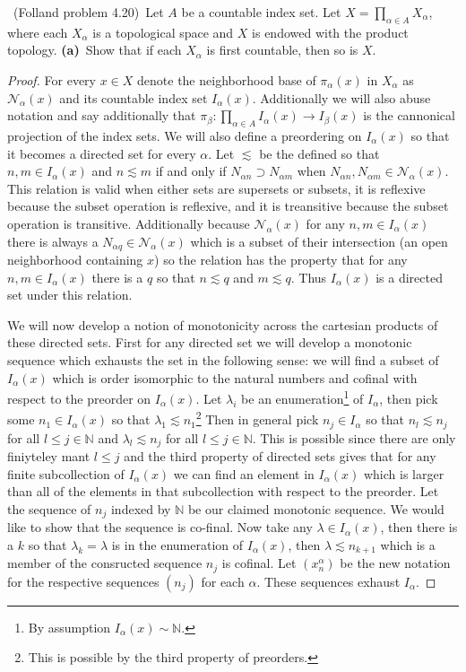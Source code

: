 \documentclass[11pt]{amsart}
\theoremstyle{definition}
\numberwithin{theorem}{section}
\numberwithin{definition}{section}
\numberwithin{equation}{section}
\def\scriptn{{\mathcal N}}
\begin{document}
\medskip {}\ (Folland problem 4.20)\ 
Let $A$ be a countable index set.
Let $X = \prod_{\alpha\in A} X_\alpha$,
where each $X_\alpha$ is a topological space
and $X$ is endowed with the product topology.
{\bf (a)}\ 
Show that if each $X_\alpha$ is first countable, then so is $X$.
\begin{proof}
	For every $x \in X$ denote the neighborhood base of $\pi_\alpha(x)$ in $X_\alpha$ as $\scriptn_\alpha(x)$ and its countable index set $I_\alpha(x)$. Additionally we will also abuse notation and say additionally that $\pi_\beta : \prod_{\alpha \in A} I_\alpha(x) \to I_\beta(x)$ is the cannonical projection of the index sets. We will also define a preordering on $I_\alpha(x)$ so that it becomes a directed set for every $\alpha.$ Let $\lesssim$ be the defined so that $n, m \in I_\alpha(x)$ and $n \lesssim m$ if and only if $N_{\alpha n} \supset N_{\alpha m}$ when $N_{\alpha n}, N_{\alpha m} \in \scriptn_\alpha(x)$. This relation  is valid when either sets are supersets or subsets, it is reflexive because the subset operation is reflexive, and it is treansitive because the subset operation is transitive. Additionally because $\scriptn_\alpha(x)$ for any $n,m \in I_\alpha(x)$ there is always a $N_{\alpha q} \in \scriptn_\alpha(x)$ which is a subset of their intersection (an open neighborhood containing $x$) so the relation has the property that for any $n,m \in I_\alpha(x)$ there is a $q$ so that $n \lesssim q$ and $m\lesssim q$. Thus $I_\alpha(x)$ is a directed set under this relation.

	We will now develop a notion of monotonicity across the cartesian products of these directed sets. First for any directed set we will develop a monotonic sequence which exhausts the set in the following sense: we will find a subset of $I_\alpha(x)$ which is order isomorphic to the natural numbers and cofinal with respect to the preorder on $I_\alpha(x).$ Let $\lambda_i$ be an enumeration\footnote{By assumption $I_\alpha(x) \sim \mathbb{N}.$} of $I_\alpha$, then pick some $n_1 \in I_\alpha(x)$ so that $\lambda_1 \lesssim n_1$\footnote{This is possible by the third property of preorders.} Then in general pick $n_j \in I_\alpha$ so that $n_l \lesssim n_j$ for all $l \leq j \in \mathbb{N}$ and $\lambda_l \lesssim n_j$ for all $l \leq j \in \mathbb{N}$. This is possible since there are only finiyteley mant $l \leq j$ and the third property of directed sets gives that for any finite subcollection of $I_\alpha(x)$ we can find an element in $I_\alpha(x)$ which is larger than all of the elements in that subcollection with respect to the preorder. Let the sequence of $n_j$ indexed by $\mathbb{N}$ be our claimed monotonic sequence. We would like to show that the sequence is co-final. Now take any $\lambda \in I_\alpha(x)$, then there is a $k$ so that $\lambda_k = \lambda$ is in the enumeration of $I_\alpha(x)$, then $\lambda \lesssim n_{k+1}$ which is a member of the consructed sequence $n_j$ is cofinal. Let $(x^\alpha_n)$ be the new notation for the respective sequences $(n_j)$ for each $\alpha$. These sequences exhaust $I_\alpha.$


\end{proof}
\end{document}
